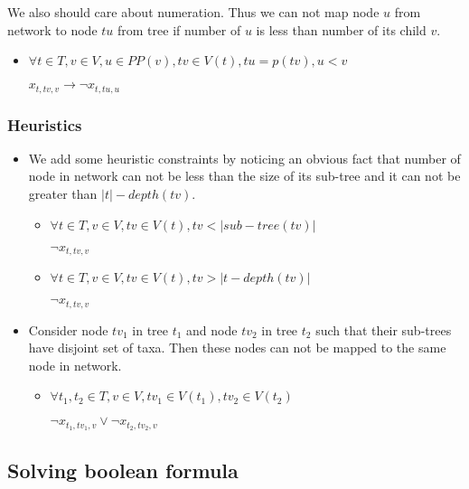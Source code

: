 \documentclass[runningheads, envcountsame, a4paper]{llncs}
\begin{document}
\begin{itemize}
	We also should care about numeration. Thus we can not map node $u$ from network to node $tu$ from tree if 
	number of $u$ is less than number of its child $v$.

	\begin{itemize}
    \item $\forall t \in T, v \in V, u \in PP(v), tv \in V(t), tu = p(tv), u < v$

    $x_{t,tv,v} \rightarrow \neg x_{t,tu,u}$
	\end {itemize}
	
\end {itemize}

\subsubsection{Heuristics}

\begin{itemize}
	\item We add some heuristic constraints by noticing an obvious fact that number of node in network can not be 
	less than the size of its sub-tree and it can not be greater than $|t| - depth(tv)$.

	\begin{itemize}
    \item $\forall t \in T, v \in V, tv \in V(t), tv < |sub-tree(tv)|$

    $\neg x_{t,tv,v}$
    
    \item $\forall t \in T, v \in V, tv \in V(t), tv > |t - depth(tv)|$
    
    $\neg x_{t,tv,v}$
	\end {itemize}
	
	\item Consider node $tv_1$ in tree $t_1$ and node $tv_2$ in tree $t_2$ such that their sub-trees have disjoint 
	set of taxa. Then these nodes can not be mapped to the same node in network.
	
	\begin{itemize}
    \item $\forall t_1, t_2 \in T, v \in V, tv_1 \in V(t_1), tv_2 \in V(t_2)$

    $\neg x_{t_1,tv_1,v} \vee \neg x_{t_2,tv_2,v}$

	\end {itemize}

\end {itemize}

\subsection{Solving boolean formula}
\end{document}
